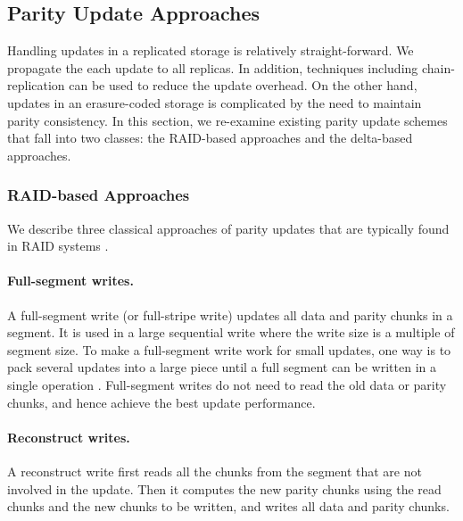 \subsection{Parity Update Approaches}
\label{sec:parity_background}

Handling updates in a replicated storage is relatively straight-forward. We 
propagate the each update to all replicas. In addition, techniques including 
chain-replication \cite{vanRenesse04} can be used to reduce the update overhead.
On the other hand, updates in an erasure-coded storage is complicated by the
need to maintain parity consistency.  
In this section, we re-examine existing parity update schemes
that fall into two classes: the RAID-based approaches and the delta-based
approaches. 


\subsubsection{RAID-based Approaches}

We describe three classical approaches of parity updates that are typically
found in RAID systems \cite{chen95,thomasian05}. 


\paragraph{Full-segment writes.} A full-segment write (or full-stripe write)
updates all data and parity chunks in a segment. 
It is used in a large sequential
write where the write size is a multiple of segment size.  To make a
full-segment write work for small updates, one way is to pack several updates
into a large piece until a full segment can be written in a single operation 
\cite{menon95}. Full-segment writes do not need to read the old data or parity
chunks, and hence achieve the best update performance.


\paragraph{Reconstruct writes.} A reconstruct write first reads all the chunks
from the segment that are not involved in the update.  Then it computes the new parity chunks
using the read chunks and the new chunks to be written, and writes all data
and parity chunks. 

